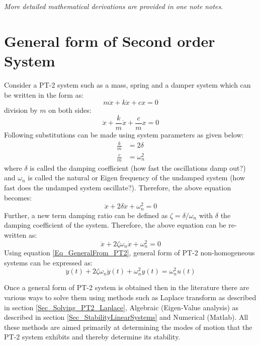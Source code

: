 \textit{More detailed mathematical derivations are provided in one note notes}.

\section{General form of Second order System}

Consider a PT-2 system such as a mass, spring and a damper system which can be written in the form as:
\begin{equation}
m \ddot{x} + k \dot{x} + c x = 0
\end{equation}
division by $m$ on both sides:
\begin{equation*}
\ddot{x} + \frac{k}{m} \dot{x} + \frac{c}{m} x = 0
\end{equation*}
Following substitutions can be made using system parameters as given below:
\begin{align*}
\frac{k}{m} &= 2 \delta \\
\frac{c}{m} &= \omega_{n}^{2}
\end{align*}
where $\delta$ is called the damping coefficient (how fast the oscillations damp out?) and $\omega_{n}$ is called the natural or Eigen frequency of the undamped system (how fast does the undamped system oscillate?). Therefore, the above equation becomes:
\begin{equation}
\ddot{x} + 2 \delta \dot{x} + \omega_{n}^2 = 0
\end{equation}
Further, a new term damping ratio can be defined as $\zeta = \delta / \omega_{n}$ with $\delta$ the damping coefficient of the system. Therefore, the above equation can be re-written as:
\begin{equation}\label{Eq_GeneralFrom_PT2}
\ddot{x} + 2 \zeta \omega_{n} \dot{x} + \omega_{n}^2 = 0
\end{equation}
Using equation \eqref{Eq_GeneralFrom_PT2}, general form of PT-2 non-homogeneous systems can be expressed as:
\begin{equation} \label{Eq_PT2_system}
\ddot{y}(t) + 2 \zeta \omega_{n} \dot{y}(t) + \omega_{n}^{2} y(t) = \omega_{n}^{2} u(t)
\end{equation}

Once a general form of PT-2 system is obtained then in the literature there are various ways to solve them using methods such as Laplace transform as described in section \ref{Sec_Solving_PT2_Laplace}, Algebraic (Eigen-Value analysis) as described in section \ref{Sec_StabilityLinearSystems} and Numerical (Matlab). All these methods are aimed primarily at determining the modes of motion that the PT-2 system exhibits and thereby determine its stability.

